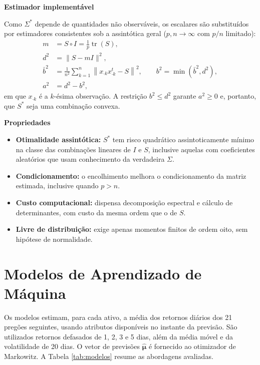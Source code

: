 \documentclass[12pt,a4paper]{article}
\begin{document}
\textbf{Estimador implementável}

Como $\Sigma^{*}$ depende de quantidades não observáveis, os escalares são substituídos por estimadores consistentes sob a assintótica geral ($p, n \to \infty$ com $p/n$ limitado):
\begin{align}
    m &= S \circ I = \frac{1}{p}\operatorname{tr}(S), \\
    d^{2} &= \|S - mI\|^{2}, \\
    \bar{b}^{2} &= \frac{1}{n^{2}} \sum_{k=1}^{n} \left\| x_{\cdot k} x_{\cdot k}^{t} - S \right\|^{2}, \qquad
    b^{2} = \min\!\left(\bar{b}^{2}, d^{2}\right), \\
    a^{2} &= d^{2} - b^{2},
\end{align}
em que $x_{\cdot k}$ é a $k$-ésima observação. A restrição $b^{2} \le d^{2}$ garante $a^{2} \ge 0$ e, portanto, que $S^{*}$ seja uma combinação convexa.

\textbf{Propriedades}

\begin{itemize}
    \item \textbf{Otimalidade assintótica:} $S^{*}$ tem risco quadrático assintoticamente mínimo na classe das combinações lineares de $I$ e $S$, inclusive aquelas com coeficientes aleatórios que usam conhecimento da verdadeira $\Sigma$.
    \item \textbf{Condicionamento:} o encolhimento melhora o condicionamento da matriz estimada, inclusive quando $p > n$.
    \item \textbf{Custo computacional:} dispensa decomposição espectral e cálculo de determinantes, com custo da mesma ordem que o de $S$.
    \item \textbf{Livre de distribuição:} exige apenas momentos finitos de ordem oito, sem hipótese de normalidade.
\end{itemize}


\section{Modelos de Aprendizado de Máquina}

Os modelos estimam, para cada ativo, a média dos retornos diários dos 21 pregões seguintes, usando atributos disponíveis no instante da previsão. São utilizados retornos defasados de 1, 2, 3 e 5 dias, além da média móvel e da volatilidade de 20 dias. O vetor de previsões $\hat{\boldsymbol{\mu}}$ é fornecido ao otimizador de Markowitz. A Tabela \ref{tab:modelos} resume as abordagens avaliadas.
\end{document}
